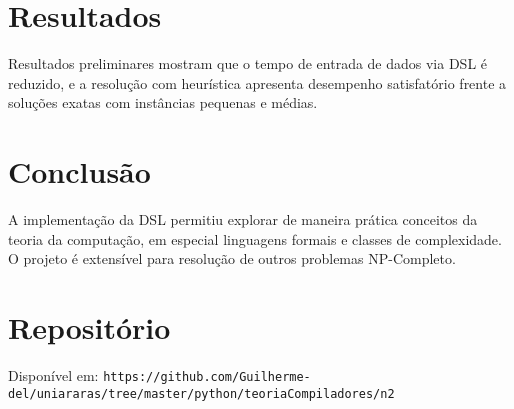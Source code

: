 \documentclass[conference]{IEEEtran}
\begin{document}
\section{Resultados}
Resultados preliminares mostram que o tempo de entrada de dados via DSL é reduzido, e a resolução com heurística apresenta desempenho satisfatório frente a soluções exatas com instâncias pequenas e médias.

\section{Conclusão}
A implementação da DSL permitiu explorar de maneira prática conceitos da teoria da computação, em especial linguagens formais e classes de complexidade. O projeto é extensível para resolução de outros problemas NP-Completo.

\section*{Repositório}
Disponível em: \texttt{https://github.com/Guilherme-del/uniararas/tree/master/python/teoriaCompiladores/n2}



\end{document}
